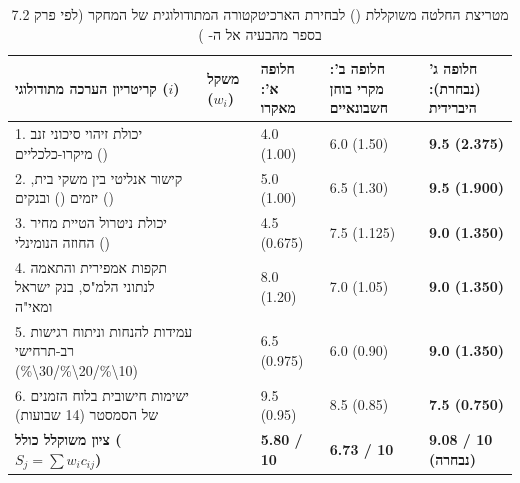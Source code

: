 \begin{table}[htbp]
\caption{מטריצת החלטה משוקללת () לבחירת הארכיטקטורה המתודולוגית של המחקר (לפי פרק \num{7.2} בספר מהבעיה אל ה- \cite{segal2026prep,pugh1991total})}
\label{tab:pugh_decision_matrix}
\centering
\small
\renewcommand{\arraystretch}{1.25}
\begin{tabularx}{\textwidth}{Y C{1.5cm} C{2.2cm} C{2.2cm} C{2.5cm}}
\toprule
{}
\textbf{קריטריון הערכה מתודולוגי ($i$)} & \textbf{משקל ($w_i$)} & \textbf{חלופה א': מאקרו } & \textbf{חלופה ב': מקרי בוחן חשבונאיים} & \textbf{חלופה ג' (נבחרת): היברידית } \\
. יכולת זיהוי סיכוני זנב מיקרו-כלכליים () &  & \num{4.0} (\num{1.00}) & \num{6.0} (\num{1.50}) & \textbf{\num{9.5} (\num{2.375})} \\
2. קישור אנליטי בין משקי בית, יזמים () ובנקים () &  & \num{5.0} (\num{1.00}) & \num{6.5} (\num{1.30}) & \textbf{\num{9.5} (\num{1.900})} \\
3. יכולת ניטרול הטיית מחיר החוזה הנומינלי () &  & \num{4.5} (\num{0.675}) & \num{7.5} (\num{1.125}) & \textbf{\num{9.0} (\num{1.350})} \\
4. תקפות אמפירית והתאמה לנתוני הלמ"ס, בנק ישראל ומאי"ה &  & \num{8.0} (\num{1.20}) & \num{7.0} (\num{1.05}) & \textbf{\num{9.0} (\num{1.350})} \\
5. עמידות להנחות וניתוח רגישות רב-תרחישי (\num{10\%/20\%/30\%}) &  & \num{6.5} (\num{0.975}) & \num{6.0} (\num{0.90}) & \textbf{\num{9.0} (\num{1.350})} \\
6. ישימות חישובית בלוח הזמנים של הסמסטר (\num{14} שבועות) &  & \num{9.5} (\num{0.95}) & \num{8.5} (\num{0.85}) & \textbf{\num{7.5} (\num{0.750})} \\
\midrule
{}
\textbf{ציון משוקלל כולל ($S_j = \sum w_i c_{ij}$)} & \textbf{} & \textbf{\num{5.80} / \num{10}} & \textbf{\num{6.73} / \num{10}} & \textbf{\color{BrandTeal}\num{9.08} / \num{10} (נבחרה)} \\
\bottomrule
\end{tabularx}
\end{table}

